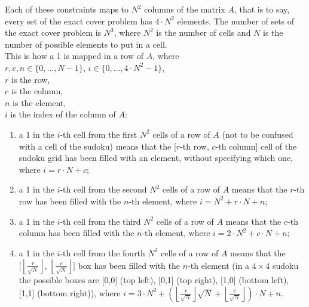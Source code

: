 \documentclass{beamer}
\begin{document}
\begin{frame}
    Each of these constraints maps to $N^2$ columns of the matrix $A$, that is to say,
    every set of the exact cover problem has $4\cdot N^2$ elements.
    The number of sets of the exact cover problem is $N^3$, where $N^2$ is the number of cells
    and $N$ is the number of possible elements to put in a cell. \\
    This is how a 1 is mapped in a row of $A$, where \\ 
    $r,c,n \in \{0,\dots,N-1\}$, $i \in \{0,\dots,4\cdot N^2-1\}$, \\
    $r$ is the row, \\
    $c$ is the column, \\
    $n$ is the element, \\
    $i$ is the index of the column of $A$:
\end{frame}
\begin{frame}    
    \begin{enumerate}
        \item a 1 in the $i$-th cell from the first $N^2$ cells of a row of $A$ (not to be confused
        with a cell of the sudoku) means that
        the [$r$-th row, $c$-th column] cell of the sudoku grid has been filled with an element, without specifying which one,
        where $i = r\cdot N + c$;
        \item a 1 in the $i$-th cell from the second $N^2$ cells of a row of $A$ means that
        the $r$-th row has been filled with the $n$-th element, where $i = N^2 + r\cdot N + n$;
        \item a 1 in the $i$-th cell from the third $N^2$ cells of a row of $A$ means that
        the $c$-th column has been filled with the $n$-th element, 
        where $i = 2\cdot N^2 + c\cdot N + n$;
        \item a 1 in the $i$-th cell from the fourth $N^2$ cells of a row of $A$ means that
        the $\big[\left\lfloor\frac{r}{\sqrt{N}}\right\rfloor$, $\left\lfloor\frac{c}{\sqrt{N}}\right\rfloor\big]$ box has been filled with the $n$-th element
        (in a $4\times 4$ sudoku the possible boxes are [0,0] (top left), 
        [0,1] (top right), [1,0] (bottom left), [1,1] (bottom right)),
        where $i = 3\cdot N^2 + \left(\left\lfloor\frac{r}{\sqrt{N}}\right\rfloor \sqrt{N}
        + \left\lfloor\frac{c}{\sqrt{N}}\right\rfloor\right)\cdot N + n$.
    \end{enumerate}
\end{frame}
\end{document}
